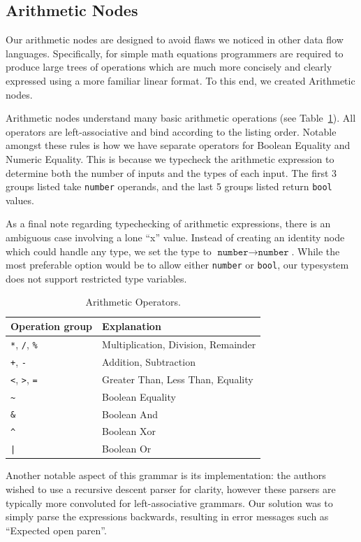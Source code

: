 \documentclass[12pt,UTF8,a4]{article}
\newcommand{\code}[1]{\texttt{#1}}
\newcommand{\type}[1]{\texttt{#1}}
\begin{document}
\subsection{Arithmetic Nodes}
Our arithmetic nodes are designed to avoid flaws we noticed in other
data flow languages. Specifically, for simple math equations
programmers are required to produce large trees of operations which
are much more concisely and clearly expressed using a more familiar
linear format. To this end, we created Arithmetic nodes.

Arithmetic nodes understand many basic arithmetic operations (see
Table~\ref{tab:arithops}). All operators are left-associative and
bind according to the listing order. Notable amongst these rules is
how we have separate operators for Boolean Equality and Numeric
Equality. This is because we typecheck the arithmetic expression to
determine both the number of inputs and the types of each input. The
first 3 groups listed take \type{number} operands, and the last 5
groups listed return \type{bool} values.

As a final note regarding typechecking of arithmetic expressions,
there is an ambiguous case involving a lone ``x'' value. Instead of
creating an identity node which could handle any type, we set the type
to $\type{number} \rightarrow \type{number}$. While the most
preferable option would be to allow either \type{number} or
\type{bool}, our typesystem does not support restricted type
variables.

\begin{table}
\center
\begin{tabular}{l|l}
\hline
Operation group & Explanation \\
\hline
\code{*}, \code{/}, \code{\%} & Multiplication, Division, Remainder \\
\code{+}, \code{-} & Addition, Subtraction \\
\code{\textless}, \code{\textgreater}, \code{=} & Greater Than, Less Than, Equality \\
\code{\textasciitilde} & Boolean Equality \\
\code{\&} & Boolean And \\
\code{\^} & Boolean Xor \\
\code{|} & Boolean Or \\
\hline
\end{tabular}
\caption{Arithmetic Operators.}\label{tab:arithops}
\end{table}

Another notable aspect of this grammar is its implementation: the
authors wished to use a recursive descent parser for clarity, however
these parsers are typically more convoluted for left-associative
grammars. Our solution was to simply parse the expressions backwards,
resulting in error messages such as ``Expected open paren''.
\end{document}
